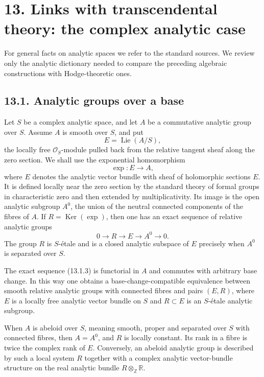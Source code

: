 \documentclass[11pt]{article}
\providecommand{\Lie}{\operatorname{Lie}}
\providecommand{\Ker}{\operatorname{Ker}}
\providecommand{\cO}{\mathcal O}
\providecommand{\Z}{\mathbb Z}
\providecommand{\R}{\mathbb R}
\begin{document}
\section*{13. Links with transcendental theory: the complex analytic case}

For general facts on analytic spaces we refer to the standard sources.  We review only the analytic dictionary needed to compare the preceding algebraic constructions with Hodge-theoretic ones.

\subsection*{13.1. Analytic groups over a base}

Let \(S\) be a complex analytic space, and let \(A\) be a commutative analytic group over \(S\).  Assume \(A\) is smooth over \(S\), and put
\begin{equation}\tag{13.1.1}
        E=\Lie(A/S),
\end{equation}
the locally free \(\cO_S\)-module pulled back from the relative tangent sheaf along the zero section.  We shall use the exponential homomorphism
\begin{equation}\tag{13.1.2}
        \exp:E\longrightarrow A,
\end{equation}
where \(E\) denotes the analytic vector bundle with sheaf of holomorphic sections \(E\).  It is defined locally near the zero section by the standard theory of formal groups in characteristic zero and then extended by multiplicativity.  Its image is the open analytic subgroup \(A^0\), the union of the neutral connected components of the fibres of \(A\).  If \(R=\Ker(\exp)\), then one has an exact sequence of relative analytic groups
\begin{equation}\tag{13.1.3}
        0\longrightarrow R\longrightarrow E\longrightarrow A^0\longrightarrow 0.
\end{equation}
The group \(R\) is \(S\)-\'etale and is a closed analytic subspace of \(E\) precisely when \(A^0\) is separated over \(S\).

The exact sequence (13.1.3) is functorial in \(A\) and commutes with arbitrary base change.  In this way one obtains a base-change-compatible equivalence between smooth relative analytic groups with connected fibres and pairs \((E,R)\), where \(E\) is a locally free analytic vector bundle on \(S\) and \(R\subset E\) is an \(S\)-\'etale analytic subgroup.

When \(A\) is abeloid over \(S\), meaning smooth, proper and separated over \(S\) with connected fibres, then \(A=A^0\), and \(R\) is locally constant.  Its rank in a fibre is twice the complex rank of \(E\).  Conversely, an abeloid analytic group is described by such a local system \(R\) together with a complex analytic vector-bundle structure on the real analytic bundle \(R\otimes_\Z\R\).
\end{document}
